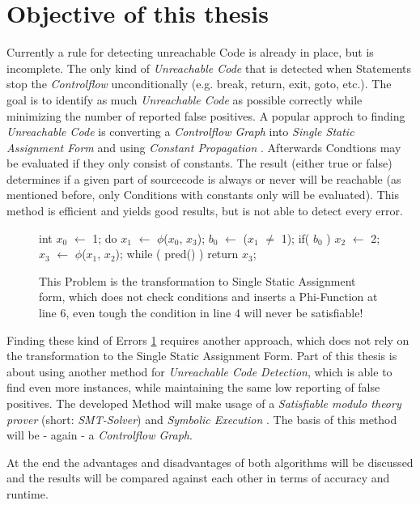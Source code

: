\section{Objective of this thesis}
Currently a rule for detecting unreachable Code is already in place, but is incomplete.
The only kind of \emph{Unreachable Code} that is detected when Statements stop the \emph{Controlflow} unconditionally (e.g. break, return, exit, goto, etc.).
The goal is to identify as much \emph{Unreachable Code} as possible correctly while minimizing the number of reported false positives.
A popular approch to finding \emph{Unreachable Code} is converting a \emph{Controlflow Graph} into \emph{Single Static Assignment Form} and using \emph{Constant Propagation} \cite{Click_1995}.
Afterwards Condtions may be evaluated if they only consist of constants. The result (either true or false) determines if a given part of sourcecode is always or never will be reachable (as mentioned before, only Conditions with constants only will be evaluated).
This method is efficient and yields good results, but is not able to detect every error.
\begin{figure}
    \begin{GenericCode}
    int $x_0$ $\leftarrow$ 1;
    do { $x_1$ $\leftarrow$ $\phi$($x_0$, $x_3$);
        $b_0$ $\leftarrow$ ($x_{1}$ $\neq$ 1);
        if( $b_0$ )
            $x_2$ $\leftarrow$ 2;
        $x_3$ $\leftarrow$ $\phi$($x_1$, $x_2$);
    } while ( pred() )
    return $x_3$;
    \end{GenericCode}
    \caption{This Problem \cite{Click_1995} is the transformation to Single Static Assignment form, which does not check conditions and inserts a Phi-Function at line 6, even tough the condition in line 4 will never be satisfiable!}
    \label{code:ssa-defect}
\end{figure}
Finding these kind of Errors \ref{code:ssa-defect} requires another approach, which does not rely on the transformation to the Single Static Assignment Form.
Part of this thesis is about using another method for \emph{Unreachable Code Detection}, which is able to find even more instances, while maintaining the same low reporting of false positives.
The developed Method will make usage of a \emph{Satisfiable modulo theory prover} (short: \emph{SMT-Solver}) and \emph{Symbolic Execution} . The basis of this method will be - again - a \emph{Controlflow Graph}.

At the end the advantages and disadvantages of both algorithms will be discussed and the results will be compared against each other in terms of accuracy and runtime.

